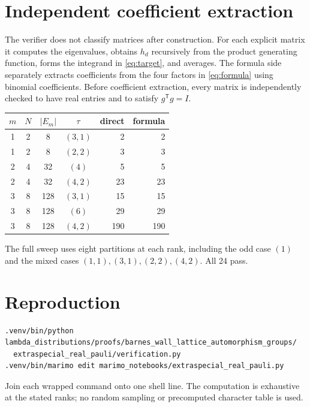 \documentclass[11pt]{article}
\begin{document}
\section{Independent coefficient extraction}
The verifier does not classify matrices after construction.  For each
explicit matrix it computes the eigenvalues, obtains $h_d$ recursively from
the product generating function, forms the integrand in \eqref{eq:target},
and averages.  The formula side separately extracts coefficients from the
four factors in \eqref{eq:formula} using binomial coefficients.
Before coefficient extraction, every matrix is independently checked to have
real entries and to satisfy $g^{\mathsf T}g=I$.

\begin{center}
\begin{tabular}{@{}c@{\quad}c@{\quad}c@{\quad}c@{\qquad}r@{\qquad}r@{}}\toprule
$m$&$N$&$|E_m|$&$\tau$&direct&formula\\\midrule
1&2&8&$(3,1)$&2&2\\
1&2&8&$(2,2)$&3&3\\
2&4&32&$(4)$&5&5\\
2&4&32&$(4,2)$&23&23\\
3&8&128&$(3,1)$&15&15\\
3&8&128&$(6)$&29&29\\
3&8&128&$(4,2)$&190&190\\\bottomrule
\end{tabular}
\end{center}
The full sweep uses eight partitions at each rank, including the odd case
$(1)$ and the mixed cases $(1,1),(3,1),(2,2),(4,2)$.  All 24 pass.

\section{Reproduction}
\begin{verbatim}
.venv/bin/python lambda_distributions/proofs/barnes_wall_lattice_automorphism_groups/
  extraspecial_real_pauli/verification.py
.venv/bin/marimo edit marimo_notebooks/extraspecial_real_pauli.py
\end{verbatim}
Join each wrapped command onto one shell line.  The computation is exhaustive
at the stated ranks; no random sampling or precomputed character table is
used.
\end{document}

